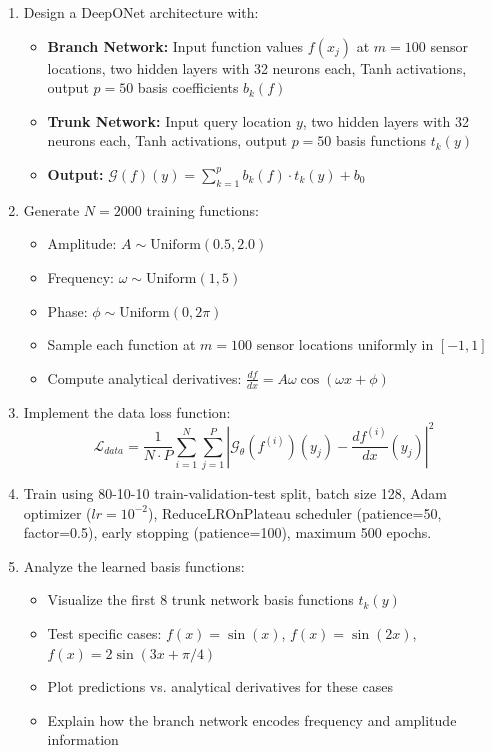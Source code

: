 \documentclass[11pt]{article}
\begin{document}
	\begin{enumerate}
		\item[\textbf{a)}] Design a DeepONet architecture with:
		\begin{itemize}
			\item \textbf{Branch Network:} Input function values $f(x_j)$ at $m = 100$ sensor locations, two hidden layers with 32 neurons each, Tanh activations, output $p = 50$ basis coefficients $b_k(f)$
			\item \textbf{Trunk Network:} Input query location $y$, two hidden layers with 32 neurons each, Tanh activations, output $p = 50$ basis functions $t_k(y)$
			\item \textbf{Output:} $\mathcal{G}(f)(y) = \sum_{k=1}^{p} b_k(f) \cdot t_k(y) + b_0$
		\end{itemize}
		
		\item[\textbf{b)}] Generate $N = 2000$ training functions:
		\begin{itemize}
			\item Amplitude: $A \sim \text{Uniform}(0.5, 2.0)$
			\item Frequency: $\omega \sim \text{Uniform}(1, 5)$
			\item Phase: $\phi \sim \text{Uniform}(0, 2\pi)$
			\item Sample each function at $m = 100$ sensor locations uniformly in $[-1, 1]$
			\item Compute analytical derivatives: $\frac{df}{dx} = A\omega\cos(\omega x + \phi)$
		\end{itemize}
		
		\item[\textbf{c)}] Implement the data loss function:
		\begin{equation*}
			\mathcal{L}_{data} = \frac{1}{N \cdot P} \sum_{i=1}^{N} \sum_{j=1}^{P} \left|\mathcal{G}_\theta(f^{(i)})(y_j) - \frac{df^{(i)}}{dx}(y_j)\right|^2
		\end{equation*}
		
		\item[\textbf{d)}] Train using 80-10-10 train-validation-test split, batch size 128, Adam optimizer ($lr = 10^{-2}$), ReduceLROnPlateau scheduler (patience=50, factor=0.5), early stopping (patience=100), maximum 500 epochs.
		
		\item[\textbf{e)}] Analyze the learned basis functions:
		\begin{itemize}
			\item Visualize the first 8 trunk network basis functions $t_k(y)$
			\item Test specific cases: $f(x) = \sin(x)$, $f(x) = \sin(2x)$, $f(x) = 2\sin(3x + \pi/4)$
			\item Plot predictions vs. analytical derivatives for these cases
			\item Explain how the branch network encodes frequency and amplitude information
		\end{itemize}
		

\end{enumerate}
\end{document}
